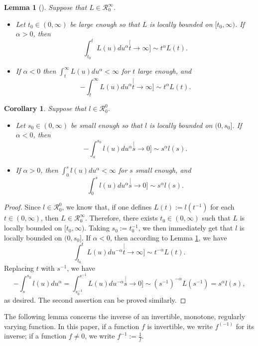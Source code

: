 \documentclass[12pt, a4paper]{amsart}
\newtheorem{lem}[thm]{Lemma}
\newtheorem{cro}[thm]{Corollary}
\theoremstyle{definition}
\numberwithin{equation}{section}
\begin{document}
\begin{lem}[{\cite[Propositions 1.5.8. and 1.5.10]{BinghamGoldieTeugels1989Regular}}]
\label{lem: exchange slowly varying function and integration}
	Suppose that $L\in \mathcal R^\infty_0$.
\begin{itemize}
\item
	Let $t_0\in (0,\infty)$ be large enough so that $L$ is locally bounded on $[t_0,\infty)$. If $\alpha>0 $, then
\[
	\int_{t_0}^t L(u)du^\alpha
	\stackrel[t\to \infty]{}{\sim} t^\alpha L(t).
\]
\item
	If $\alpha< 0$ then $\int_t^\infty L(u) du^\alpha < \infty$ for $t$ large enough, and
\[
	-\int_t^\infty L(u)du^\alpha
	\stackrel[t\to \infty]{}{\sim} t^\alpha L(t).
\]
\end{itemize}
\end{lem}

\begin{cro}
\label{cro: power law and ingetration}
	Suppose that $l\in \mathcal R^0_0$.
\begin{itemize}
\item
	Let $s_0\in (0,\infty)$ be small enough so that $l$ is locally bounded on $(0,s_0]$.
	If $\alpha < 0$, then
	\[
	-\int_s^{s_0} l(u)du^\alpha
	\stackrel[s\to 0]{}{\sim} s^{\alpha} l(s).
	\]
\item
	If $\alpha > 0$, then $\int_0^s l(u)du^\alpha<\infty$ for $s$ small enough, and
\[
	\int_0^s l(u)du^\alpha
	\stackrel[s\to 0]{}{\sim} s^{\alpha} l(s).
\]
\end{itemize}
\end{cro}	

\begin{proof}
	Since $l \in \mathcal R^0_0$, we know that, if one defines $L(t):=l(t^{-1})$ for each $t\in (0,\infty)$, then $ L \in \mathcal R^\infty_0$.
	Therefore, there exists $t_0\in (0,\infty)$ such that $L$ is locally bounded on $[t_0,\infty)$.
	Taking $s_0:= t_0^{-1}$, we then immediately get that $l$ is locally bounded on $(0,s_0]$.
	If $\alpha<0 $, then according to Lemma \ref{lem: exchange slowly varying function and integration}, we have
\[
	\int_{t_0}^t L(u)du^{-\alpha}
	\stackrel[t\to \infty]{}{\sim} t^{-\alpha}  L(t).
\]
	Replacing $t$ with $s^{-1}$, we have
\[
	-\int_{s}^{s_0} l(u)du^{\alpha}
	=\int_{s_0^{-1}}^{s^{-1}} L(u)du^{-\alpha}
	\stackrel[s\to 0]{}{\sim}  (s^{-1})^{-\alpha}L(s^{-1})
	=s^\alpha l(s),
\]
	as desired.
	The second assertion can be proved similarly.
\end{proof}

	The following lemma concerns the inverse of 
    an invertible, monotone, regularly varying function.
	In this paper, if a function $f$ is 
	invertible,
	we write $f^{(-1)}$ for its inverse; 
	if a function $f\neq 0$, we write $f^{-1} := \frac{1}{f} $.
\end{document}
